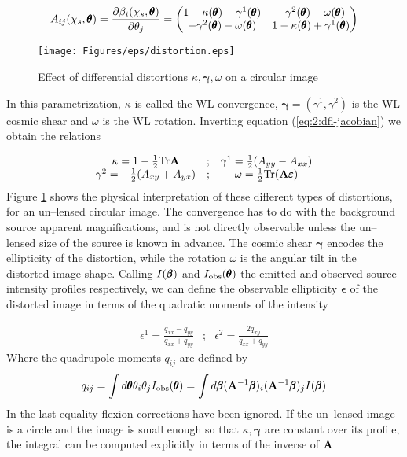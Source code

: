 \begin{equation}
\label{eq:2:dfl-jacobian}
A_{ij}(\chi_s,\pmb{\theta}) = \frac{\partial \beta_i(\chi_s,\pmb{\theta})}{\partial \theta_j} = 
\begin{pmatrix}
1-\kappa(\pmb{\theta})-\gamma^1(\pmb{\theta}) & -\gamma^2(\pmb{\theta})+\omega(\pmb{\theta}) \\
-\gamma^2(\pmb{\theta})-\omega(\pmb{\theta}) & 1-\kappa(\pmb{\theta})+\gamma^1(\pmb{\theta})
\end{pmatrix}
\end{equation}  
%
\begin{figure}
\begin{center}
\texttt{[image: Figures/eps/distortion.eps]}
\end{center}
\caption{Effect of differential distortions $\kappa,\pmb{\gamma},\omega$ on a circular image}
\label{fig:2:distortion}
\end{figure}
%
In this parametrization, $\kappa$ is called the WL convergence, $\pmb{\gamma}=(\gamma^1,\gamma^2)$ is the WL cosmic shear and $\omega$ is the WL rotation. Inverting equation (\ref{eq:2:dfl-jacobian}) we obtain the relations

\begin{equation}
\label{eq:2:dfl-inverse}
\begin{matrix}
\kappa = 1-\frac{1}{2}{\rm Tr} \mathbf{A} & ; & \gamma^1 = \frac{1}{2}(A_{yy} - A_{xx}) \\
\gamma^2 = -\frac{1}{2}(A_{xy}+A_{yx}) & ; & \omega = \frac{1}{2}{\rm Tr} (\mathbf{A}\pmb{\varepsilon})
\end{matrix}
\end{equation}
% 
Figure \ref{fig:2:distortion} shows the physical interpretation of these different types of distortions, for an un--lensed circular image. The convergence has to do with the background source apparent magnifications, and is not directly observable unless the un--lensed size of the source is known in advance. The cosmic shear $\pmb{\gamma}$ encodes the ellipticity of the distortion, while the rotation $\omega$ is the angular tilt in the distorted image shape. Calling $I(\pmb{\beta})$ and $I_{\rm obs}(\pmb{\theta})$ the emitted and observed source intensity profiles respectively, we can define the observable ellipticity $\pmb{\epsilon}$ of the distorted image in terms of the quadratic moments of the intensity 

\begin{equation}
\label{eq:2:ellipticity-1}
\begin{matrix}
\epsilon^1 = \frac{q_{xx}-q_{yy}}{q_{xx}+q_{yy}} & ; & \epsilon^2 = \frac{2q_{xy}}{q_{xx}+q_{yy}}
\end{matrix}
\end{equation} 
%
Where the quadrupole moments $q_{ij}$ are defined by 
\begin{equation}
\label{eq:2:quadrupole}
q_{ij} = \int d\pmb{\theta} \theta_i\theta_j I_{\rm obs}(\pmb{\theta}) = \int d\pmb{\beta} (\mathbf{A}^{-1}\pmb{\beta})_i(\mathbf{A}^{-1}\pmb{\beta})_j I(\pmb{\beta})
\end{equation}
%
In the last equality flexion corrections have been ignored. If the un--lensed image is a circle and the image is small enough so that $\kappa,\pmb{\gamma}$ are constant over its profile, the integral can be computed explicitly in terms of the inverse of $\mathbf{A}$

